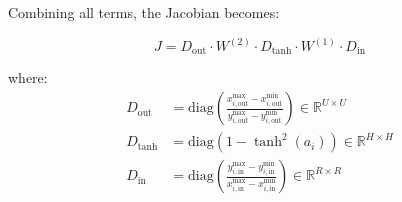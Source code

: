 \documentclass[a4paper,12pt]{article}
\begin{document}
Combining all terms, the Jacobian becomes:

\[
J = D_{\text{out}} \cdot W^{(2)} \cdot D_{\tanh} \cdot W^{(1)} \cdot D_{\text{in}}
\]

where:
\begin{align*}
D_{\text{out}} &= \text{diag} \left( \frac{x^{\max}_{i,\text{out}} - x^{\min}_{i,\text{out}}}{y^{\max}_{i,\text{out}} - y^{\min}_{i,\text{out}}} \right) \in \mathbb{R}^{U \times U} \\
D_{\tanh} &= \text{diag} \left( 1 - \tanh^2(a_i) \right) \in \mathbb{R}^{H \times H} \\
D_{\text{in}} &= \text{diag} \left( \frac{y^{\max}_{i,\text{in}} - y^{\min}_{i,\text{in}}}{x^{\max}_{i,\text{in}} - x^{\min}_{i,\text{in}}} \right) \in \mathbb{R}^{R \times R}
\end{align*}
\end{document}

